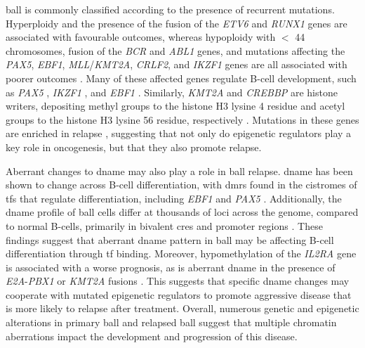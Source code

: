 \Gls{ball} is commonly classified according to the presence of recurrent mutations.
Hyperploidy and the presence of the fusion of the \emph{ETV6} and \emph{RUNX1} genes are associated with favourable outcomes, whereas hypoploidy with $<$ 44 chromosomes, fusion of the \emph{BCR} and \emph{ABL1} genes, and mutations affecting the \emph{PAX5}, \emph{EBF1}, \emph{MLL}/\emph{KMT2A}, \emph{CRLF2}, and \emph{IKZF1} genes are all associated with poorer outcomes \cite{inabaAcuteLymphoblasticLeukaemia2013,hungerAcuteLymphoblasticLeukemia2015}.
Many of these affected genes regulate B-cell development, such as \emph{PAX5} \cite{liuPax5LossImposes2014,dangPAX5TumorSuppressor2015,mullighanGenomewideAnalysisGenetic2007}, \emph{IKZF1} \cite{mullighanGenomewideAnalysisGenetic2007}, and \emph{EBF1} \cite{}.
Similarly, \emph{KMT2A} and \emph{CREBBP} are histone writers, depositing methyl groups to the histone H3 lysine 4 residue and acetyl groups to the histone H3 lysine 56 residue, respectively \cite{slanyMLLFusionProteins2020,krivtsovMLLTranslocationsHistone2007,raoHijackedCancerKMT22015,parkPHD3DomainMLL2010,liStructuralBasisActivity2016,dasBindingHistoneChaperone2014}.
Mutations in these genes are enriched in relapse \cite{hungerAcuteLymphoblasticLeukemia2015,mullighanGenomicAnalysisClonal2008}, suggesting that not only do epigenetic regulators play a key role in oncogenesis, but that they also promote relapse.

Aberrant changes to \gls{dname} may also play a role in \gls{ball} relapse.
\Gls{dname} has been shown to change across B-cell differentiation, with \glspl{dmr} found in the cistromes of \glspl{tf} that regulate differentiation, including \emph{EBF1} and \emph{PAX5} \cite{leeGlobalDNAMethylation2012}.
Additionally, the \gls{dname} profile of \gls{ball} cells differ at thousands of loci across the genome, compared to normal B-cells, primarily in bivalent \glspl{cre} and promoter regions \cite{leeEpigeneticRemodelingBcell2015,nordlundGenomewideSignaturesDifferential2013}.
These findings suggest that aberrant \gls{dname} pattern in \gls{ball} may be affecting B-cell differentiation through \gls{tf} binding.
Moreover, hypomethylation of the \emph{IL2RA} gene is associated with a worse prognosis, as is aberrant \gls{dname} in the presence of \emph{E2A}-\emph{PBX1} or \emph{KMT2A} fusions \cite{gengIntegrativeEpigenomicAnalysis2012}.
This suggests that specific \gls{dname} changes may cooperate with mutated epigenetic regulators to promote aggressive disease that is more likely to relapse after treatment.
Overall, numerous genetic and epigenetic alterations in primary \gls{ball} and relapsed \gls{ball} suggest that multiple chromatin aberrations impact the development and progression of this disease.

